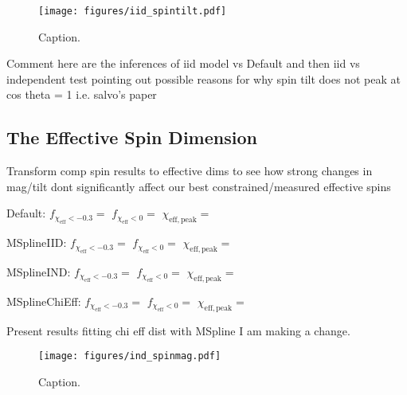 \begin{figure}
    \texttt{[image: figures/iid\_spintilt.pdf]}
    \caption{Caption.}
    \label{fig:iid_spintilt_dist}
\end{figure}

Comment here are the inferences of iid model vs Default and then iid vs independent test pointing out possible reasons for why spin tilt 
does not peak at cos theta = 1 i.e. salvo's paper

\subsection{The Effective Spin Dimension}

Transform comp spin results to effective dims to see how strong changes in mag/tilt dont significantly affect our best constrained/measured
effective spins

Default: $f_{\chi_\mathrm{eff}<-0.3} = $\result{$\CIPlusMinus{\macros[ChiEffective][default][FracBelowNeg0p3]}$} 
$f_{\chi_\mathrm{eff}<0} = $\result{$\CIPlusMinus{\macros[ChiEffective][default][FracBelow0]}$} 
$\chi_\mathrm{eff, peak} = $\result{$\CIPlusMinus{\macros[ChiEffective][default][PeakChiEff]}$} 

MSplineIID: $f_{\chi_\mathrm{eff}<-0.3} = $\result{$\CIPlusMinus{\macros[ChiEffective][iid][FracBelowNeg0p3]}$}
   $f_{\chi_\mathrm{eff}<0} = $\result{$\CIPlusMinus{\macros[ChiEffective][iid][FracBelow0]}$} 
   $\chi_\mathrm{eff, peak} = $\result{$\CIPlusMinus{\macros[ChiEffective][iid][PeakChiEff]}$} 

MSplineIND: $f_{\chi_\mathrm{eff}<-0.3} = $\result{$\CIPlusMinus{\macros[ChiEffective][ind][FracBelowNeg0p3]}$}
   $f_{\chi_\mathrm{eff}<0} = $\result{$\CIPlusMinus{\macros[ChiEffective][ind][FracBelow0]}$} 
   $\chi_\mathrm{eff, peak} = $\result{$\CIPlusMinus{\macros[ChiEffective][ind][PeakChiEff]}$} 

MSplineChiEff: $f_{\chi_\mathrm{eff}<-0.3} = $\result{$\CIPlusMinus{\macros[ChiEffective][chieff][FracBelowNeg0p3]}$}
      $f_{\chi_\mathrm{eff}<0} = $\result{$\CIPlusMinus{\macros[ChiEffective][chieff][FracBelow0]}$} 
      $\chi_\mathrm{eff, peak} = $\result{$\CIPlusMinus{\macros[ChiEffective][chieff][PeakChiEff]}$} 



Present results fitting chi eff dist with MSpline I am making a change. 

\begin{figure}
    \texttt{[image: figures/ind\_spinmag.pdf]}
    \caption{Caption.}
    \label{fig:ind_spinmag_dist}
\end{figure}


